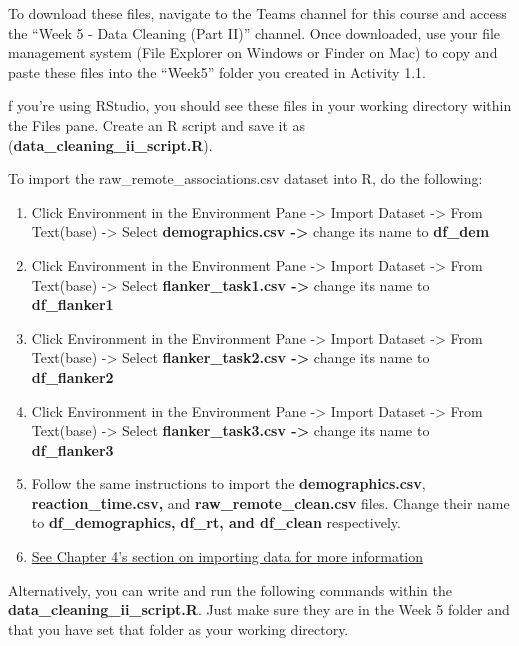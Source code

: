 \documentclass[
]{book}
\providecommand{\tightlist}{%
  \setlength{\itemsep}{0pt}\setlength{\parskip}{0pt}}
\begin{document}
To download these files, navigate to the Teams channel for this course and access the ``Week 5 - Data Cleaning (Part II)'' channel. Once downloaded, use your file management system (File Explorer on Windows or Finder on Mac) to copy and paste these files into the ``Week5'' folder you created in Activity 1.1.

f you're using RStudio, you should see these files in your working directory within the Files pane. Create an R script and save it as (\textbf{data\_cleaning\_ii\_script.R}).

To import the raw\_remote\_associations.csv dataset into R, do the following:

\begin{enumerate}
\def\labelenumi{\arabic{enumi}.}
\tightlist
\item
  Click Environment in the Environment Pane -\textgreater{} Import Dataset -\textgreater{} From Text(base) -\textgreater{} Select \textbf{demographics.csv -\textgreater{}} change its name to \textbf{df\_dem}
\item
  Click Environment in the Environment Pane -\textgreater{} Import Dataset -\textgreater{} From Text(base) -\textgreater{} Select \textbf{flanker\_task1.csv -\textgreater{}} change its name to \textbf{df\_flanker1}
\item
  Click Environment in the Environment Pane -\textgreater{} Import Dataset -\textgreater{} From Text(base) -\textgreater{} Select \textbf{flanker\_task2.csv -\textgreater{}} change its name to \textbf{df\_flanker2}
\item
  Click Environment in the Environment Pane -\textgreater{} Import Dataset -\textgreater{} From Text(base) -\textgreater{} Select \textbf{flanker\_task3.csv -\textgreater{}} change its name to \textbf{df\_flanker3}
\item
  Follow the same instructions to import the \textbf{demographics.csv}, \textbf{reaction\_time.csv,} and \textbf{raw\_remote\_clean.csv} files. Change their name to \textbf{df\_demographics,} \textbf{df\_rt, and df\_clean} respectively.
\item
  \protect\hyperlink{importing}{See Chapter 4's section on importing data for more information}
\end{enumerate}

Alternatively, you can write and run the following commands within the \textbf{data\_cleaning\_ii\_script.R}. Just make sure they are in the Week 5 folder and that you have set that folder as your working directory.
\end{document}
